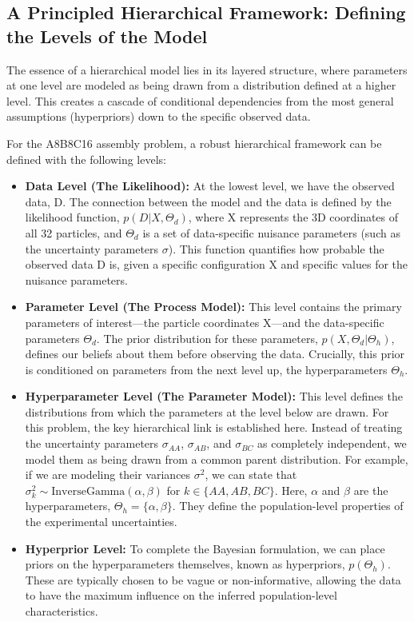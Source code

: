 \documentclass{article}
\begin{document}
\subsection{A Principled Hierarchical Framework: Defining the Levels of the Model}

The essence of a hierarchical model lies in its layered structure, where parameters at one level are modeled as being drawn from a distribution defined at a higher level. This creates a cascade of conditional dependencies from the most general assumptions (hyperpriors) down to the specific observed data.\cite{ref7}

For the A8B8C16 assembly problem, a robust hierarchical framework can be defined with the following levels:

\begin{itemize}
  \item \textbf{Data Level (The Likelihood):} At the lowest level, we have the observed data, D. The connection between the model and the data is defined by the likelihood function, $p(D | X, \Theta_d)$, where X represents the 3D coordinates of all 32 particles, and $\Theta_d$ is a set of data-specific nuisance parameters (such as the uncertainty parameters $\sigma$). This function quantifies how probable the observed data D is, given a specific configuration X and specific values for the nuisance parameters.
  \item \textbf{Parameter Level (The Process Model):} This level contains the primary parameters of interest—the particle coordinates X—and the data-specific parameters $\Theta_d$. The prior distribution for these parameters, $p(X, \Theta_d | \Theta_h)$, defines our beliefs about them before observing the data. Crucially, this prior is conditioned on parameters from the next level up, the hyperparameters $\Theta_h$.
  \item \textbf{Hyperparameter Level (The Parameter Model):} This level defines the distributions from which the parameters at the level below are drawn. For this problem, the key hierarchical link is established here. Instead of treating the uncertainty parameters $\sigma_{AA}$, $\sigma_{AB}$, and $\sigma_{BC}$ as completely independent, we model them as being drawn from a common parent distribution. For example, if we are modeling their variances $\sigma^2$, we can state that $\sigma_k^2 \sim \text{InverseGamma}(\alpha, \beta)$ for $k \in \{AA, AB, BC\}$. Here, $\alpha$ and $\beta$ are the hyperparameters, $\Theta_h = \{\alpha, \beta\}$. They define the population-level properties of the experimental uncertainties.
  \item \textbf{Hyperprior Level:} To complete the Bayesian formulation, we can place priors on the hyperparameters themselves, known as hyperpriors, $p(\Theta_h)$. These are typically chosen to be vague or non-informative, allowing the data to have the maximum influence on the inferred population-level characteristics.
\end{itemize}
\end{document}
